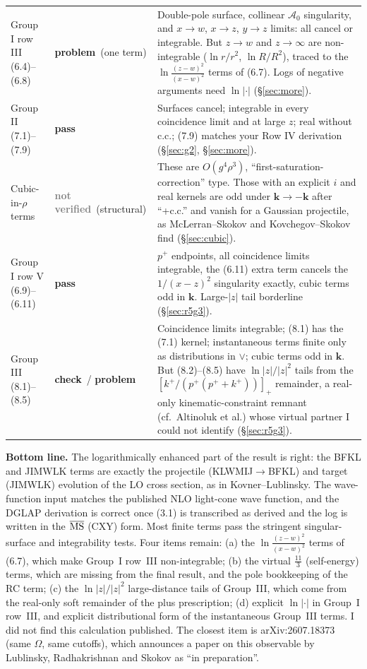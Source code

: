 \documentclass[10pt]{article}
\newcommand{\ok}{\textcolor{green!45!black}{\textbf{pass}}}
\newcommand{\bad}{\textcolor{red!70!black}{\textbf{problem}}}
\newcommand{\warn}{\textcolor{orange!85!black}{\textbf{check}}}
\newcommand{\nv}{\textcolor{gray}{\textbf{not verified}}}
\begin{document}
\begin{longtable}{p{4.3cm}p{1.6cm}p{9.6cm}}
Group I row III (6.4)--(6.8) & \bad\ (one term) & Double-pole surface, collinear $\mathcal A_0$ singularity, and $x\to w$, $x\to z$, $y\to z$ limits: all cancel or integrable. But $z\to w$ and $z\to\infty$ are non-integrable ($\ln r/r^2$, $\ln R/R^2$), traced to the $\ln\frac{(z-w)^2}{(x-w)^2}$ terms of (6.7). Logs of negative arguments need $\ln|\cdot|$ (\S\ref{sec:more}). \\
Group II (7.1)--(7.9) & \ok & Surfaces cancel; integrable in every coincidence limit and at large $z$; real without c.c.; (7.9) matches your Row IV derivation (\S\ref{sec:g2}, \S\ref{sec:more}). \\
Cubic-in-$\rho$ terms & \nv\ (structural) & These are $O(g^4\rho^3)$, ``first-saturation-correction'' type. Those with an explicit $i$ and real kernels are odd under $\mathbf k\to-\mathbf k$ after ``+c.c.'' and vanish for a Gaussian projectile, as McLerran--Skokov and Kovchegov--Skokov find (\S\ref{sec:cubic}). \\
Group I row V (6.9)--(6.11) & \ok & $p^+$ endpoints, all coincidence limits integrable, the (6.11) extra term cancels the $1/(x-z)^2$ singularity exactly, cubic terms odd in $\mathbf k$. Large-$|z|$ tail borderline (\S\ref{sec:r5g3}). \\
Group III (8.1)--(8.5) & \warn\ / \bad & Coincidence limits integrable; (8.1) has the (7.1) kernel; instantaneous terms finite only as distributions in $\vee$; cubic terms odd in $\mathbf k$. But (8.2)--(8.5) have $\ln|z|/|z|^2$ tails from the $[k^+/(p^+(p^++k^+))]_+$ remainder, a real-only kinematic-constraint remnant (cf.\ Altinoluk et al.) whose virtual partner I could not identify (\S\ref{sec:r5g3}). \\
\bottomrule
\end{longtable}

\noindent\textbf{Bottom line.} The logarithmically enhanced part of the result is right: the BFKL and JIMWLK terms are exactly the
projectile (KLWMIJ$\to$BFKL) and target (JIMWLK) evolution of the LO cross section, as in Kovner--Lublinsky. The wave-function input
matches the published NLO light-cone wave function, and the DGLAP derivation is correct once (3.1) is transcribed as derived and the log is
written in the $\overline{\rm MS}$ (CXY) form. Most finite terms pass the stringent singular-surface and integrability tests. Four items remain:
(a) the $\ln\frac{(z-w)^2}{(x-w)^2}$ terms of (6.7), which make Group~I row~III non-integrable;
(b) the virtual $\frac{11}{3}$ (self-energy) terms, which are missing from the final result, and the pole bookkeeping of the RC term;
(c) the $\ln|z|/|z|^2$ large-distance tails of Group~III, which come from the real-only soft remainder of the plus prescription;
(d) explicit $\ln|\cdot|$ in Group~I row~III, and explicit distributional form of the instantaneous Group~III terms.
I did not find this calculation published. The closest item is arXiv:2607.18373 (same $\Omega$, same cutoffs), which announces a paper on this
observable by Lublinsky, Radhakrishnan and Skokov as ``in preparation''.
\end{document}
